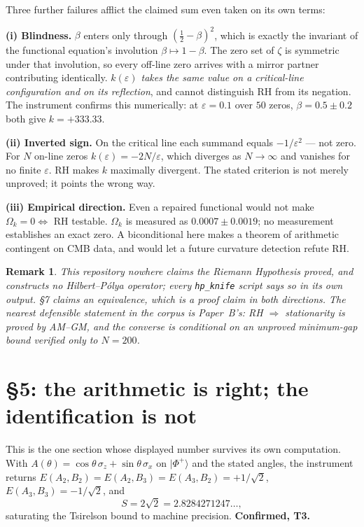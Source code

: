 \documentclass[11pt,a4paper]{article}
\newtheorem{remark}{Remark}
\begin{document}
Three further failures afflict the claimed sum even taken on its own terms:

\textbf{(i) Blindness.} $\beta$ enters only through $(\tfrac12-\beta)^2$, which is
exactly the invariant of the functional equation's involution $\beta\mapsto1-\beta$.
The zero set of $\zeta$ is symmetric under that involution, so every off-line zero
arrives with a mirror partner contributing identically. \emph{$k(\varepsilon)$ takes
the same value on a critical-line configuration and on its reflection}, and cannot
distinguish RH from its negation. The instrument confirms this numerically: at
$\varepsilon=0.1$ over $50$ zeros, $\beta=0.5\pm0.2$ both give $k=+333.33$.

\textbf{(ii) Inverted sign.} On the critical line each summand equals
$-1/\varepsilon^2$ --- not zero. For $N$ on-line zeros
$k(\varepsilon) = -2N/\varepsilon$, which diverges as $N\to\infty$ and vanishes for
no finite $\varepsilon$. RH makes $k$ maximally divergent. The stated criterion is
not merely unproved; it points the wrong way.

\textbf{(iii) Empirical direction.} Even a repaired functional would not make
$\Omega_k = 0\Leftrightarrow$ RH testable. $\Omega_k$ is measured as
$0.0007\pm0.0019$; no measurement establishes an exact zero. A biconditional here
makes a theorem of arithmetic contingent on CMB data, and would let a future
curvature detection refute RH.

\begin{remark}
This repository nowhere claims the Riemann Hypothesis proved, and constructs no
Hilbert--P\'olya operator; every \texttt{hp\_knife} script says so in its own
output. \S7 claims an \emph{equivalence}, which is a proof claim in both directions.
The nearest defensible statement in the corpus is Paper~B's: RH $\Rightarrow$
stationarity is proved by AM--GM, and the converse is \emph{conditional} on an
unproved minimum-gap bound verified only to $N=200$.
\end{remark}

\section{\S5: the arithmetic is right; the identification is not}
\label{sec:ewfs}

This is the one section whose displayed number survives its own computation.
With $A(\theta)=\cos\theta\,\sigma_z+\sin\theta\,\sigma_x$ on $|\Phi^+\rangle$ and
the stated angles, the instrument returns
$E(A_2,B_2)=E(A_2,B_3)=E(A_3,B_2)=+1/\sqrt2$, $E(A_3,B_3)=-1/\sqrt2$, and
\[
S = 2\sqrt2 = 2.8284271247\ldots,
\]
saturating the Tsirelson bound to machine precision. \textbf{Confirmed, T3.}
\end{document}
